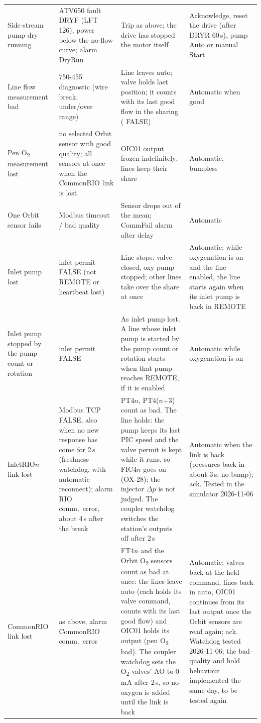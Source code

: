\documentclass[11pt,a4paper]{article}
\newcommand{\Otwo}{O\textsubscript{2}}
\begin{document}
\begin{small}
\begin{longtable}{@{}P{34mm}P{40mm}P{48mm}P{30mm}@{}}
Side-stream pump dry running & ATV650 fault DRYF (LFT 126), power below the no-flow curve; alarm DryRun & Trip as above; the drive has stopped the motor itself & Acknowledge, reset the drive (after DRYR 60\,s), pump Auto or manual Start \\
Line flow measurement bad & 750-455 diagnostic (wire break, under/over range) & Line leaves auto; valve holds last position; it counts with its last good flow in the sharing ( FALSE) & Automatic when good \\
Pen \Otwo{} measurement lost & no selected Orbit sensor with good quality; all sensors at once when the CommonRIO link is lost & OIC01 output frozen indefinitely; lines keep their share & Automatic, bumpless \\
One Orbit sensor fails & Modbus timeout / bad quality & Sensor drops out of the mean; CommFail alarm after delay & Automatic \\
Inlet pump lost & inlet permit FALSE (not REMOTE or heartbeat lost) & Line stops: valve closed, oxy pump stopped; other lines take over the share at once & Automatic: while oxygenation is on and the line enabled, the line starts again when its inlet pump is back in REMOTE \\
Inlet pump stopped by the pump count or rotation & inlet permit FALSE & As inlet pump lost. A line whose inlet pump is started by the pump count or rotation starts when that pump reaches REMOTE, if it is enabled & Automatic while oxygenation is on \\
InletRIO$n$ link lost & Modbus TCP  FALSE, also when no new response has come for 2\,s (freshness watchdog, with automatic reconnect); alarm RIO comm.\ error, about 4\,s after the break & PT4$n$, PT4($n$+3) count as bad. The line holds: the pump keeps its last PIC speed and the valve permit is kept while it runs, so FIC4$n$ goes on (OX-28); the injector $\Delta p$ is not judged. The coupler watchdog switches the station's outputs off after 2\,s & Automatic when the link is back (pressures back in about 3\,s, no bump); ack. Tested in the simulator 2026-11-06 \\
CommonRIO link lost & as above, alarm CommonRIO comm.\ error & FT4$n$ and the Orbit \Otwo{} sensors count as bad at once: the lines leave auto (each holds its valve command, counts with its last good flow) and OIC01 holds its output (pen \Otwo{} bad). The coupler watchdog sets the \Otwo{} valves' AO to 0\,mA after 2\,s, so no oxygen is added until the link is back & Automatic: valves back at the held command, lines back in auto, OIC01 continues from its last output once the Orbit sensors are read again; ack. Watchdog tested 2026-11-06; the bad-quality and hold behaviour implemented the same day, to be tested again \\

\end{longtable}
\end{small}
\end{document}
